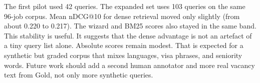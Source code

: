 The first pilot used 42 queries. The expanded set uses 103 queries on the same 96-job corpus. Mean nDCG@10 for dense retrieval moved only slightly (from about 0.220 to 0.217). The wizard and BM25 scores also stayed in the same band. This stability is useful. It suggests that the dense advantage is not an artefact of a tiny query list alone. Absolute scores remain modest. That is expected for a synthetic but graded corpus that mixes languages, visa phrases, and seniority words. Future work should add a second human annotator and more real vacancy text from Gold, not only more synthetic queries.


